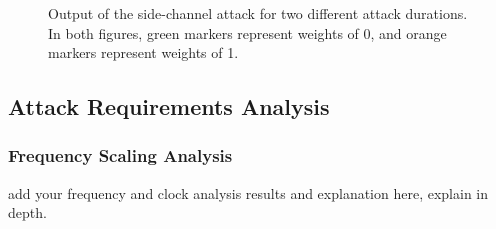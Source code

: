 \begin{figure}[h!]
\begin{minipage}{0.5\linewidth}
    \end{minipage}
    \caption{Output of the side-channel attack for two different attack durations. In both figures, green markers represent weights of 0, and orange markers represent weights of 1.}
    \label{fig:LeakedWeights}
\end{figure}


\subsection{Attack Requirements Analysis}
\subsubsection{Frequency Scaling Analysis}
{\color{red} add your frequency and clock analysis results and explanation here, explain in depth. }





